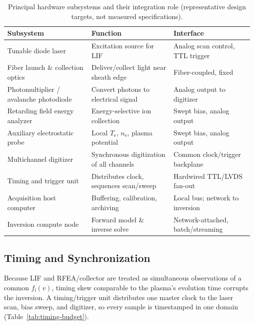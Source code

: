 \begin{table}[htbp]
\centering
\caption{Principal hardware subsystems and their integration role (representative design targets, not measured specifications).}
\label{tab:hardware-inventory}
\begin{tabularx}{\textwidth}{@{}l X l@{}}
\toprule
Subsystem & Function & Interface \\
\midrule
Tunable diode laser & Excitation source for LIF & Analog scan control, TTL trigger \\
Fiber launch \& collection optics & Deliver/collect light near sheath edge & Fiber-coupled, fixed \\
Photomultiplier / avalanche photodiode & Convert photons to electrical signal & Analog output to digitizer \\
Retarding field energy analyzer & Energy-selective ion collection & Swept bias, analog output \\
Auxiliary electrostatic probe & Local $T_{\mathrm{e}}$, $n_{\mathrm{e}}$, plasma potential & Swept bias, analog output \\
Multichannel digitizer & Synchronous digitization of all channels & Common clock/trigger backplane \\
Timing and trigger unit & Distributes clock, sequences scan/sweep & Hardwired TTL/LVDS fan-out \\
Acquisition host computer & Buffering, calibration, archiving & Local bus; network to inversion \\
Inversion compute node & Forward model \& inverse solve & Network-attached, batch/streaming \\
\bottomrule
\end{tabularx}
\end{table}

\subsection{Timing and Synchronization}
\label{sec:timing}

Because LIF and RFEA/collector are treated as simultaneous observations of a common $f_{\mathrm{i}}(v)$, timing skew comparable to the plasma's evolution time corrupts the inversion. A timing/trigger unit distributes one master clock to the laser scan, bias sweep, and digitizer, so every sample is timestamped in one domain (Table~\ref{tab:timing-budget}).

